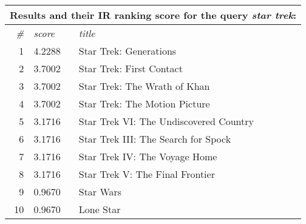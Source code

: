\begin{table}[h]
  \centering 

  \begin{tabular*}{0.9\textwidth}{ r l p{8cm} }
    \multicolumn{3}{l}{Results and their IR ranking score for the query \emph{star trek}:}\\
    \toprule
    \emph{\#} & \emph{score} & \emph{title}\\
    \midrule
    1 & 4.2288 & Star Trek: Generations                 \\
    2 & 3.7002 & Star Trek: First Contact               \\
    3 & 3.7002 & Star Trek: The Wrath of Khan           \\
    4 & 3.7002 & Star Trek: The Motion Picture          \\
    5 & 3.1716 & Star Trek VI: The Undiscovered Country \\
    6 & 3.1716 & Star Trek III: The Search for Spock    \\
    7 & 3.1716 & Star Trek IV: The Voyage Home          \\
    8 & 3.1716 & Star Trek V: The Final Frontier        \\
    9 & 0.9670 & Star Wars                              \\
    10& 0.9670 & Lone Star                              \\
    \bottomrule
  \end{tabular*}

  \vspace{1em} 


\end{table}
